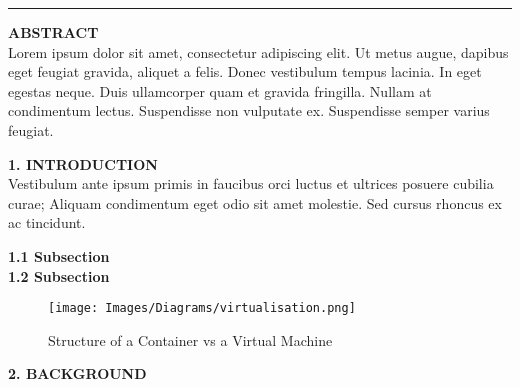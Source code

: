 
\rule{17cm}{0.05cm}
\cfoot{\thepage}
\justify %
\begin{multicols}{2} %



\textbf{\LARGE{\quad ABSTRACT}} \\ %
\normalsize{}
Lorem ipsum dolor sit amet, consectetur adipiscing elit. Ut metus augue, dapibus eget feugiat gravida, aliquet a felis. Donec vestibulum tempus lacinia. In eget egestas neque. Duis ullamcorper quam et gravida fringilla. Nullam at condimentum lectus. Suspendisse non vulputate ex. Suspendisse semper varius feugiat. 


\textbf{\LARGE{1. INTRODUCTION}} \\
\normalsize{}
Vestibulum ante ipsum primis in faucibus orci luctus et ultrices posuere cubilia curae; Aliquam condimentum eget odio sit amet molestie. Sed cursus rhoncus ex ac tincidunt. 

\textbf{\LARGE{1.1 Subsection}} \\


\textbf{\LARGE{1.2 Subsection}} \\

\begin{figure}[H] %
\centering
\texttt{[image: Images/Diagrams/virtualisation.png]}
\caption{Structure of a Container vs a Virtual Machine}
\end{figure}


\medbreak
\textbf{\LARGE{2. BACKGROUND}} \\
\normalsize{}


\end{multicols}

